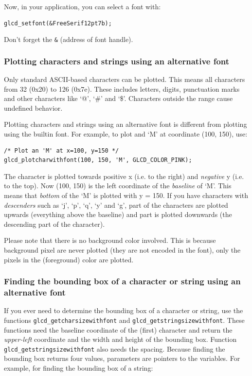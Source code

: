 \documentclass[12pt]{article}
\begin{document}
Now, in your application, you can select a font with:

\begin{lstlisting}
glcd_setfont(&FreeSerif12pt7b);
\end{lstlisting}

Don't forget the \lstinline|&| (address of font handle).

\subsubsection{Plotting characters and strings using an alternative font}
Only standard ASCII-based characters can be plotted. This means all characters from 32 (0x20) to 126 (0x7e). These includes letters, digits, punctuation marks and other characters like `@', `\#' and `\$'. Characters outside the range cause undefined behavior.

Plotting characters and strings using an alternative font is different from plotting using the builtin font. For example, to plot and `M' at coordinate (100, 150), use:

\begin{lstlisting}
/* Plot an 'M' at x=100, y=150 */
glcd_plotcharwithfont(100, 150, 'M', GLCD_COLOR_PINK);
\end{lstlisting}

The character is plotted towards positive x (i.e. to the right) and \textsl{negative} y (i.e. to the top). Now (100, 150) is the left coordinate of the \textsl{baseline} of `M'. This means that \textsl{bottom} of the `M' is plotted with y = 150. If you have characters with \textsl{descenders} such as `j', `p', `q', `y' and `g', part of the characters are plotted upwards (everything above the baseline) and part is plotted downwards (the descending part of the character).

Please note that there is no background color involved. This is because background pixel are never plotted (they are not encoded in the font), only the pixels in the (foreground) color are plotted.

\subsubsection{Finding the bounding box of a character or string using an alternative font}
If you ever need to determine the bounding box of a character or string, use the functions \lstinline|glcd_getcharsizewithfont| and \lstinline|glcd_getstringsizewithfont|. These functions need the baseline coordinate of the (first) character and return the \textsl{upper-left} coordinate and the width and height of the bounding box. Function \lstinline|glcd_getstringsizewithfont| also needs the spacing. Because finding the bounding box returns four values, parameters are pointers to the variables. For example, for finding the bounding box of a string:
\end{document}
